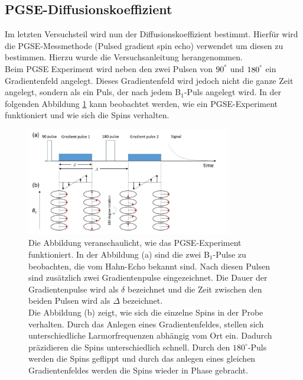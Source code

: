 \subsection{PGSE-Diffusionskoeffizient}
Im letzten Versuchsteil wird nun der Diffusionskoeffizient bestimmt. Hierfür wird die PGSE-Messmethode (Pulsed gradient spin echo) verwendet um diesen zu bestimmen.
Hierzu wurde die Versuchsanleitung \cite{PGSE} herangenommen.\\
Beim PGSE Experiment wird neben den zwei Pulsen von $90^{\degree}$ und $180^{\degree}$ ein Gradientenfeld angelegt.
Dieses Gradientenfeld wird jedoch nicht die ganze Zeit angelegt, sondern als ein Puls, der nach jedem B$_1$-Puls angelegt wird.
In der folgenden Abbildung \ref{fig:PGSE} kann beobachtet werden, wie ein PGSE-Experiment funktioniert und wie sich die Spins verhalten. 

\begin{figure}[H]
    \centering
    \includegraphics[width=0.8\textwidth]{Abbildungen/PGSE.JPG}
    \caption[Veranschaulichung der PGSE-Messmethode]{Die Abbildung veranschaulicht, wie das PGSE-Experiment funktioniert.
    In der Abbildung (a) sind die zwei B$_1$-Pulse zu beobachten, die vom Hahn-Echo bekannt sind. Nach diesen Pulsen sind zusätzlich zwei Gradientenpulse eingezeichnet. Die Dauer der Gradientenpulse wird als $\delta$ bezeichnet und die Zeit zwischen den beiden Pulsen wird als $\Delta$ bezeichnet.\\
    Die Abbildung (b) zeigt, wie sich die einzelne Spins in der Probe verhalten. Durch das Anlegen eines Gradientenfeldes, stellen sich unterschiedliche Larmorfrequenzen abhängig vom Ort ein. Dadurch präzidieren die Spins unterschiedlich schnell. Durch den $180^{\circ}$-Puls werden die Spins geflippt und durch das anlegen eines gleichen Gradientenfeldes werden die Spins wieder in Phase gebracht.   
    \cite{literaturPGSE}}
    \label{fig:PGSE}
\end{figure}

